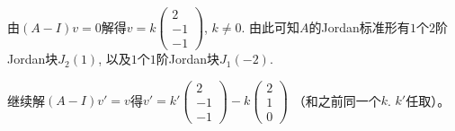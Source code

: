 由$(A - I) v = 0$解得$v = k \begin{pmatrix} 2 \\ -1 \\ -1 \end{pmatrix}$, $k \neq 0$. 由此可知$A$的Jordan标准形有$1$个$2$阶Jordan块$J_2(1)$, 以及$1$个$1$阶Jordan块$J_1(-2)$.

继续解$(A - I) v' = v$得$v' = k' \begin{pmatrix} 2 \\ -1 \\ -1 \end{pmatrix} - k \begin{pmatrix} 2 \\ 1 \\ 0 \end{pmatrix}$ （和之前同一个$k$. $k'$任取）。

